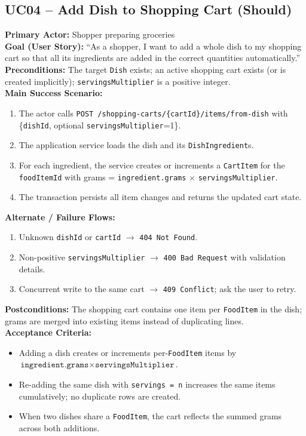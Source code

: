 \documentclass[11pt]{article}
\begin{document}
\subsection*{UC04 -- Add Dish to Shopping Cart (Should)}
\textbf{Primary Actor:} Shopper preparing groceries\\
\textbf{Goal (User Story):} ``As a shopper, I want to add a whole dish to my shopping cart so that all its ingredients are added in the correct quantities automatically.''\\
\textbf{Preconditions:} The target \texttt{Dish} exists; an active shopping cart exists (or is created implicitly); \texttt{servingsMultiplier} is a positive integer.\\
\textbf{Main Success Scenario:}
\begin{enumerate}[label=\arabic*.]
  \item The actor calls \texttt{POST /shopping-carts/\{cartId\}/items/from-dish} with \{\texttt{dishId}, optional \texttt{servingsMultiplier}=1\}.
  \item The application service loads the dish and its \texttt{DishIngredient}s.
  \item For each ingredient, the service creates or increments a \texttt{CartItem} for the \texttt{foodItemId} with grams = \texttt{ingredient.grams} \(\times\) \texttt{servingsMultiplier}.
  \item The transaction persists all item changes and returns the updated cart state.
\end{enumerate}
\textbf{Alternate / Failure Flows:}
\begin{enumerate}[label=\arabic*F.]
  \item Unknown \texttt{dishId} or \texttt{cartId} $\rightarrow$ \texttt{404 Not Found}.
  \item Non-positive \texttt{servingsMultiplier} $\rightarrow$ \texttt{400 Bad Request} with validation details.
  \item Concurrent write to the same cart $\rightarrow$ \texttt{409 Conflict}; ask the user to retry.
\end{enumerate}
\textbf{Postconditions:} The shopping cart contains one item per \texttt{FoodItem} in the dish; grams are merged into existing items instead of duplicating lines.\\
\textbf{Acceptance Criteria:}
\begin{itemize}[noitemsep]
  \item Adding a dish creates or increments per-\texttt{FoodItem} items by \(\texttt{ingredient.grams} \times \texttt{servingsMultiplier}\).
  \item Re-adding the same dish with \texttt{servings = n} increases the same items cumulatively; no duplicate rows are created.
  \item When two dishes share a \texttt{FoodItem}, the cart reflects the summed grams across both additions.
\end{itemize}
\end{document}
